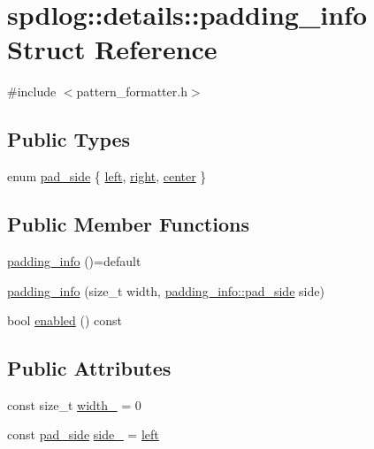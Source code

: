\hypertarget{structspdlog_1_1details_1_1padding__info}{}\section{spdlog\+:\+:details\+:\+:padding\+\_\+info Struct Reference}
\label{structspdlog_1_1details_1_1padding__info}


{\ttfamily \#include $<$pattern\+\_\+formatter.\+h$>$}

\subsection*{Public Types}
\begin{DoxyCompactItemize}
\item 
enum \hyperlink{structspdlog_1_1details_1_1padding__info_aa2ad84ba80fb8fc36b753d1a34e4942e}{pad\+\_\+side} \{ \hyperlink{structspdlog_1_1details_1_1padding__info_aa2ad84ba80fb8fc36b753d1a34e4942ea44a15fd66c1b0c03c28c995af8b4e029}{left}, 
\hyperlink{structspdlog_1_1details_1_1padding__info_aa2ad84ba80fb8fc36b753d1a34e4942ea9c57d63e3303865488819d4b5679cf09}{right}, 
\hyperlink{structspdlog_1_1details_1_1padding__info_aa2ad84ba80fb8fc36b753d1a34e4942eab923ecb127cd5e213f9d9711b5a72fb0}{center}
 \}
\end{DoxyCompactItemize}
\subsection*{Public Member Functions}
\begin{DoxyCompactItemize}
\item 
\hyperlink{structspdlog_1_1details_1_1padding__info_a2ebd71cdda444c97eba736828179b573}{padding\+\_\+info} ()=default
\item 
\hyperlink{structspdlog_1_1details_1_1padding__info_a51160b4df2aeb08f476d78d8af4c3851}{padding\+\_\+info} (size\+\_\+t width, \hyperlink{structspdlog_1_1details_1_1padding__info_aa2ad84ba80fb8fc36b753d1a34e4942e}{padding\+\_\+info\+::pad\+\_\+side} side)
\item 
bool \hyperlink{structspdlog_1_1details_1_1padding__info_a2c315d1c5ccdac54957d3d9281830ea9}{enabled} () const
\end{DoxyCompactItemize}
\subsection*{Public Attributes}
\begin{DoxyCompactItemize}
\item 
const size\+\_\+t \hyperlink{structspdlog_1_1details_1_1padding__info_abf18e8b1249987bf04dad4f368e6d91a}{width\+\_\+} = 0
\item 
const \hyperlink{structspdlog_1_1details_1_1padding__info_aa2ad84ba80fb8fc36b753d1a34e4942e}{pad\+\_\+side} \hyperlink{structspdlog_1_1details_1_1padding__info_af03346e385de821038e0aec989741d14}{side\+\_\+} = \hyperlink{structspdlog_1_1details_1_1padding__info_aa2ad84ba80fb8fc36b753d1a34e4942ea44a15fd66c1b0c03c28c995af8b4e029}{left}
\end{DoxyCompactItemize}


